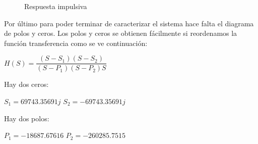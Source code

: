 \begin{figure}[H] 
\begin{center}
\caption{Respuesta impulsiva}
\label{respuestaimpulsiva}
\end{center}
\end{figure}





Por último para poder terminar de caracterizar el sistema hace falta el diagrama de polos y ceros. Los polos y ceros se obtienen fácilmente si reordenamos la función transferencia como se ve continuación:

\begin{center}
    $H(S) = \dfrac{(S-S_{1})(S-S_{2})}{(S-P_{1})(S-P_{2})S}$  \\
\end{center}

Hay dos ceros:
\begin{center}
    $S_{1}=69743.35691j $
    $S_{2}=-69743.35691j $
    \end{center}

Hay dos polos:

\begin{center}
    $P_{1}=-18687.67616$
    $P_{2}=-260285.7515$
\end{center}

